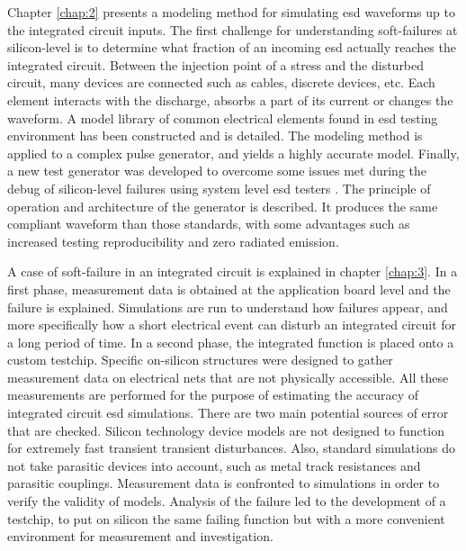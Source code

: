 %
Chapter \ref{chap:2} presents a modeling method for simulating \gls{esd} waveforms up to the integrated circuit inputs.
The first challenge for understanding soft-failures at silicon-level is to determine what fraction of an incoming \gls{esd} actually reaches the integrated circuit.
Between the injection point of a stress and the disturbed circuit, many devices are connected such as cables, discrete devices, etc.
Each element interacts with the discharge, absorbs a part of its current or changes the waveform.
A model library of common electrical elements found in \gls{esd} testing environment has been constructed and is detailed.
The modeling method is applied to a complex pulse generator, and yields a highly accurate model.
Finally, a new test generator was developed to overcome some issues met during the debug of silicon-level failures using system level \gls{esd} testers \cite{iec61000-4-2, iso10605}.
The principle of operation and architecture of the generator is described.
It produces the same compliant waveform than those standards, with some advantages such as increased testing reproducibility and zero radiated emission.

%
A case of soft-failure in an integrated circuit is explained in chapter \ref{chap:3}.
In a first phase, measurement data is obtained at the application board level and the failure is explained.
Simulations are run to understand how failures appear, and more specifically how a short electrical event can disturb an integrated circuit for a long period of time.
In a second phase, the integrated function is placed onto a custom testchip.
Specific on-silicon structures were designed to gather measurement data on electrical nets that are not physically accessible.
All these measurements are performed for the purpose of estimating the accuracy of integrated circuit \gls{esd} simulations.
There are two main potential sources of error that are checked.
Silicon technology device models are not designed to function for extremely fast transient transient disturbances.
Also, standard simulations do not take parasitic devices into account, such as metal track resistances and parasitic couplings.
Measurement data is confronted to simulations in order to verify the validity of models.
Analysis of the failure led to the development of a testchip, to put on silicon the same failing function but with a more convenient environment for measurement and investigation.

